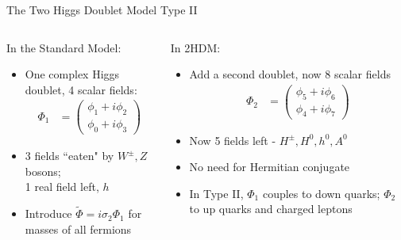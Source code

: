 \documentclass[10pt,xcolor={table,dvipsnames},t]{beamer}
\begin{document}
\begin{frame}{The Two Higgs Doublet Model Type II}
    \begin{columns}[t]
        \begin{column}{0.5\textwidth}
            In the Standard Model:
            \begin{itemize}
                \item One complex Higgs doublet, 4 scalar fields:
                    \begin{align*}
                        \Phi_1 &= \begin{pmatrix} \phi_1 + i\phi_2 \\ \phi_0+i\phi_3\end{pmatrix}
                    \end{align*}
                \item 3 fields ``eaten" by $W^\pm,Z$ bosons;\\ 1 real field left, $h$
                \item Introduce $\tilde{\Phi}=i\sigma_2\Phi_1$ for masses of all fermions
            \end{itemize}
        \end{column}
        \begin{column}{0.5\textwidth}
            In 2HDM:
            \begin{itemize}
                \item Add a second doublet, now 8 scalar fields
                    \begin{align*}
                        \Phi_2 &= \begin{pmatrix} \phi_5 + i\phi_6 \\ \phi_4 + i \phi_7\end{pmatrix}
                    \end{align*}
                \item Now 5 fields left - $H^\pm,H^0,h^0,A^0$
                \item No need for Hermitian conjugate
                \item In Type II, $\Phi_1$ couples to down quarks; $\Phi_2$ to up quarks and charged leptons
            \end{itemize}
        \end{column}
    \end{columns}
\end{frame}
\end{document}
